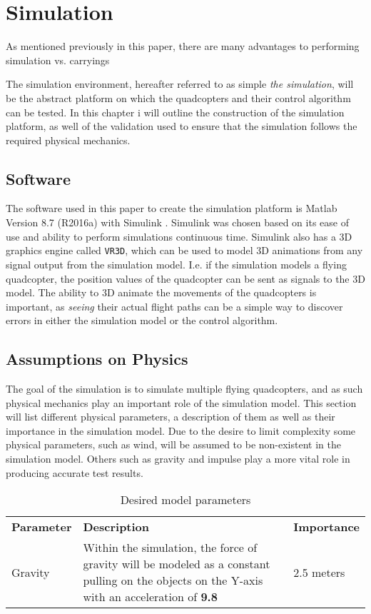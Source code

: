 
\chapter{Simulation}
\label{chap:simulation}
As mentioned previously in this paper, there are many advantages to performing simulation vs. carryings 


The simulation environment, hereafter referred to as simple \textit{the simulation}, will be the abstract platform on which the quadcopters and their control algorithm can be tested. 
In this chapter i will outline the construction of the simulation platform, as well of the validation used to ensure that the simulation follows the required physical mechanics. 

\section{Software}
The software used in this paper to create the simulation platform is Matlab Version 8.7 (R2016a) with Simulink \cite{_matlab_2016}. Simulink was chosen based on its ease of use and ability to perform simulations continuous time. Simulink also has a 3D graphics engine called \texttt{VR3D}\cite{_matlab_2016}, which can be used to model 3D animations from any signal output from the simulation model. I.e. if the simulation models a flying quadcopter, the position values of the quadcopter can be sent as signals to the 3D model. The ability to 3D animate the movements of the quadcopters is important, as \textit{seeing} their actual flight paths can be a simple way to discover errors in either the simulation model or the control algorithm. 

\section{Assumptions on Physics}
\label{sec:physics}

The goal of the simulation is to simulate multiple flying quadcopters, and as such physical mechanics play an important role of the simulation model. This section will list different physical parameters, a description of them as well as their importance in the simulation model. Due to the desire to limit complexity some physical parameters, such as wind, will be assumed to be non-existent in the simulation model. Others such as gravity and impulse play a more vital role in producing accurate test results.

\begin{table}[h!]
\centering
\begin{tabular}{lll}
\textbf{Parameter} & \textbf{Description} & \textbf{Importance} \\ 
Gravity & Within the simulation, the force of gravity will be modeled as a constant pulling on the objects on the Y-axis with an acceleration of \textbf{9.8} & 2.5 meters \\ 
\end{tabular}
\caption{Desired model parameters}
\label{fig:model_params}
\end{table}

